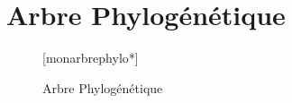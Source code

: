 \documentclass[a4paper]{article}
\begin{document}
\section{Arbre Phylogénétique}
\begin{figure}[H]

[monarbrephylo*]

\caption{Arbre Phylogénétique}
\label{arbrephylogénétique}
\end{figure}
\end{document}
